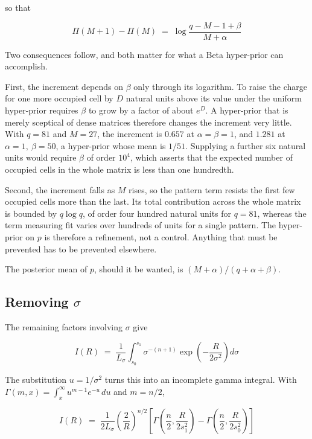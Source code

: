 so that

\begin{equation}
\Pi(M+1) - \Pi(M) \;=\; \log \frac{q-M-1+\beta}{M+\alpha}
\label{eq:increment}
\end{equation}

Two consequences follow, and both matter for what a Beta hyper-prior can accomplish.

First, the increment depends on $\beta$ only through its logarithm. To raise the
charge for one more occupied cell by $D$ natural units above its value under the
uniform hyper-prior requires $\beta$ to grow by a factor of about $e^{D}$. A
hyper-prior that is merely sceptical of dense matrices therefore changes the
increment very little. With $q = 81$ and $M = 27$, the increment is $0.657$ at
$\alpha = \beta = 1$, and $1.281$ at $\alpha = 1,\ \beta = 50$, a hyper-prior whose
mean is $1/51$. Supplying a further six natural units would require $\beta$ of order
$10^{4}$, which asserts that the expected number of occupied cells in the whole
matrix is less than one hundredth.

Second, the increment falls as $M$ rises, so the pattern term resists the first few
occupied cells more than the last. Its total contribution across the whole matrix is
bounded by $q \log q$, of order four hundred natural units for $q = 81$, whereas the
term measuring fit varies over hundreds of units for a single pattern. The
hyper-prior on $p$ is therefore a refinement, not a control. Anything that must be
prevented has to be prevented elsewhere.

The posterior mean of $p$, should it be wanted, is $(M+\alpha)/(q+\alpha+\beta)$.

\subsection{Removing $\sigma$}
\label{sec:sigmaint}

The remaining factors involving $\sigma$ give

\begin{equation}
I(R) \;=\; \frac{1}{L_{\sigma}}
\int_{s_{0}}^{s_{1}} \sigma^{-(n+1)}
\exp\!\left( -\frac{R}{2\sigma^{2}} \right) d\sigma
\label{eq:sigmaintdef}
\end{equation}

The substitution $u = 1/\sigma^{2}$ turns this into an incomplete gamma integral.
With $\Gamma(m,x) = \int_{x}^{\infty} u^{m-1} e^{-u}\, du$ and $m = n/2$,

\begin{equation}
I(R) \;=\; \frac{1}{2 L_{\sigma}}
\left( \frac{2}{R} \right)^{n/2}
\left[ \Gamma\!\left( \frac{n}{2}, \frac{R}{2 s_{1}^{2}} \right)
     - \Gamma\!\left( \frac{n}{2}, \frac{R}{2 s_{0}^{2}} \right) \right]
\label{eq:sigmaint}
\end{equation}

